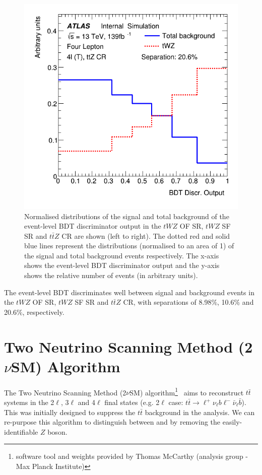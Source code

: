 \begin{figure}[h!]
	\includegraphics[scale=0.27]{figures/lep4_ttZ_4T.png}
	\centering
	\caption{Normalised distributions of the signal and total background of the event-level BDT discriminator output in the $tWZ$ OF SR, $tWZ$ SF SR and $t\bar{t}Z$ CR are shown (left to right). The dotted red and solid blue lines represent the distributions (normalised to an area of 1) of the signal and total background events respectively. The x-axis shows the event-level BDT discriminator output and the y-axis shows the relative number of events (in arbitrary units).}
	\label{fig:event-bdt-overtrain-check}
\end{figure}

The event-level BDT discriminates well between signal and background events in the $tWZ$ OF SR, $tWZ$ SF SR and $t\bar{t}Z$ CR, with separations of 8.98$\%$, 10.6$\%$ and 20.6$\%$, respectively.


\section{Two Neutrino Scanning Method (2$\nu$SM) Algorithm}
\label{sec:2vsm}
The Two Neutrino Scanning Method (2$\nu$SM) algorithm\footnote{software tool and weights provided by Thomas McCarthy (\ttZ analysis group - Max Planck Institute)}~\cite{2vSM-ref1,2vSM-ref2} aims to reconstruct $t\bar{t}$ systems in the 2$\ell$, 3$\ell$ and 4$\ell$ final states (e.g. 2$\ell$ case: $t\bar{t}\rightarrow \ell^{+}\nu_{\ell}b\ell^{-}\bar{\nu}_{\ell}\bar{b}$). This was initially designed to suppress the $t\bar{t}$ background in the \ttZ analysis. We can re-purpose this algorithm to distinguish between \tWZ and \ttZ by removing the easily-identifiable $Z$ boson.\\


